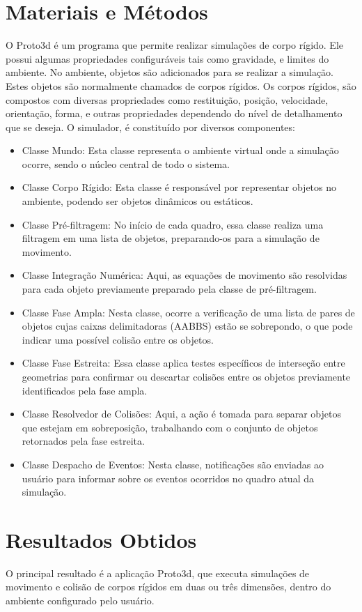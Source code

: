 \documentclass[12pt]{article}
\begin{document}
\section{Materiais e Métodos}

O Proto3d é um programa que permite realizar simulações de corpo rígido.
Ele possui algumas propriedades configuráveis tais como gravidade, e limites do ambiente.
No ambiente, objetos são adicionados para se realizar a simulação. Estes objetos são normalmente chamados de corpos rígidos.
Os corpos rígidos, são compostos com diversas propriedades como restituição, posição, velocidade, orientação, forma, e outras propriedades dependendo do nível de detalhamento que se deseja.
O simulador, é constituído  por diversos componentes:

\begin{itemize}
\item Classe Mundo: Esta classe representa o ambiente virtual onde a simulação ocorre, sendo o núcleo central de todo o sistema.
\item Classe Corpo Rígido: Esta classe é responsável por representar objetos no ambiente, podendo ser objetos dinâmicos ou estáticos.
\item Classe Pré-filtragem: No início de cada quadro, essa classe realiza uma filtragem em uma lista de objetos, preparando-os para a simulação de movimento.
\item Classe Integração Numérica: Aqui, as equações de movimento são resolvidas para cada objeto previamente preparado pela classe de pré-filtragem.
\item Classe Fase Ampla: Nesta classe, ocorre a verificação de uma lista de pares de objetos cujas caixas delimitadoras (AABBS) estão se sobrepondo, o que pode indicar uma possível colisão entre os objetos.
\item Classe Fase Estreita: Essa classe aplica testes específicos de interseção entre geometrias para confirmar ou descartar colisões entre os objetos previamente identificados pela fase ampla.
\item Classe Resolvedor de Colisões: Aqui, a ação é tomada para separar objetos que estejam em sobreposição, trabalhando com o conjunto de objetos retornados pela fase estreita.
\item Classe Despacho de Eventos: Nesta classe, notificações são enviadas ao usuário para informar sobre os eventos ocorridos no quadro atual da simulação.
\end{itemize}

\section{Resultados Obtidos}
O principal resultado é a aplicação Proto3d, que executa simulações de movimento e colisão de corpos rígidos em duas ou três dimensões, dentro do ambiente configurado pelo usuário. 
\end{document}
